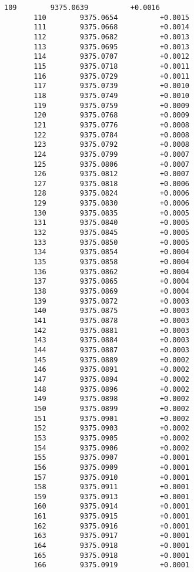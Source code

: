 \documentclass[11pt]{article}
\begin{document}
\begin{Verbatim}[commandchars=\\\{\}]
       109        9375.0639          +0.0016
       110        9375.0654          +0.0015
       111        9375.0668          +0.0014
       112        9375.0682          +0.0013
       113        9375.0695          +0.0013
       114        9375.0707          +0.0012
       115        9375.0718          +0.0011
       116        9375.0729          +0.0011
       117        9375.0739          +0.0010
       118        9375.0749          +0.0010
       119        9375.0759          +0.0009
       120        9375.0768          +0.0009
       121        9375.0776          +0.0008
       122        9375.0784          +0.0008
       123        9375.0792          +0.0008
       124        9375.0799          +0.0007
       125        9375.0806          +0.0007
       126        9375.0812          +0.0007
       127        9375.0818          +0.0006
       128        9375.0824          +0.0006
       129        9375.0830          +0.0006
       130        9375.0835          +0.0005
       131        9375.0840          +0.0005
       132        9375.0845          +0.0005
       133        9375.0850          +0.0005
       134        9375.0854          +0.0004
       135        9375.0858          +0.0004
       136        9375.0862          +0.0004
       137        9375.0865          +0.0004
       138        9375.0869          +0.0004
       139        9375.0872          +0.0003
       140        9375.0875          +0.0003
       141        9375.0878          +0.0003
       142        9375.0881          +0.0003
       143        9375.0884          +0.0003
       144        9375.0887          +0.0003
       145        9375.0889          +0.0002
       146        9375.0891          +0.0002
       147        9375.0894          +0.0002
       148        9375.0896          +0.0002
       149        9375.0898          +0.0002
       150        9375.0899          +0.0002
       151        9375.0901          +0.0002
       152        9375.0903          +0.0002
       153        9375.0905          +0.0002
       154        9375.0906          +0.0002
       155        9375.0907          +0.0001
       156        9375.0909          +0.0001
       157        9375.0910          +0.0001
       158        9375.0911          +0.0001
       159        9375.0913          +0.0001
       160        9375.0914          +0.0001
       161        9375.0915          +0.0001
       162        9375.0916          +0.0001
       163        9375.0917          +0.0001
       164        9375.0918          +0.0001
       165        9375.0918          +0.0001
       166        9375.0919          +0.0001

\end{Verbatim}
\end{document}
